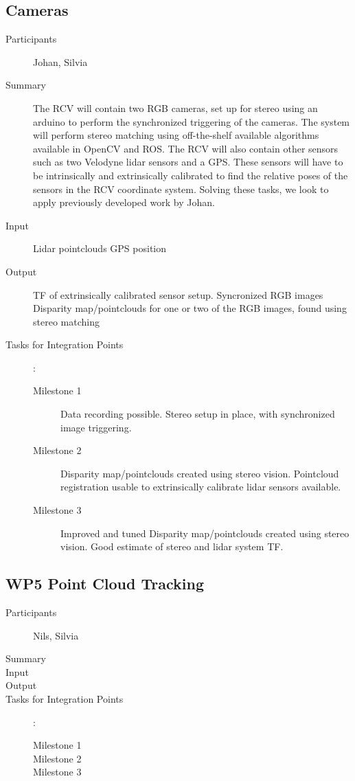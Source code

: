\documentclass[11pt,a4paper]{article}
\begin{document}
\subsection{Cameras} %
\begin{description}
\item[Participants] Johan, Silvia
\item[Summary]

The RCV will contain two RGB cameras, set up for stereo using an arduino to perform the synchronized triggering of the cameras. The system will perform stereo matching using off-the-shelf available algorithms available in OpenCV and ROS. The RCV will also contain other sensors such as two Velodyne lidar sensors and a GPS. These sensors will have to be intrinsically and extrinsically calibrated to find the relative poses of the sensors in the RCV coordinate system. Solving these tasks, we look to apply previously developed work by Johan. 

\item[Input]
	Lidar pointclouds
	GPS position
\item[Output]
	TF of extrinsically calibrated sensor setup.
	Syncronized RGB images
	Disparity map/pointclouds for one or two of the RGB images, found using stereo matching
\item[Tasks for Integration Points]:\
	\begin{description}
		\item[Milestone 1]
			Data recording possible.
			Stereo setup in place, with synchronized image triggering.
		\item[Milestone 2]
			Disparity map/pointclouds created using stereo vision.
			Pointcloud registration usable to extrinsically calibrate lidar sensors available.
		\item[Milestone 3]
			Improved and tuned Disparity map/pointclouds created using stereo vision.
			Good estimate of stereo and lidar system TF.
	\end{description}	 
\end{description}

\subsection{WP5 Point Cloud Tracking}

\begin{description}
\item[Participants] Nils, Silvia
\item[Summary]
\item[Input]
\item[Output]
\item[Tasks for Integration Points]:\
	\begin{description}
		\item[Milestone 1]
		\item[Milestone 2]
		\item[Milestone 3] 
	\end{description}	 
\end{description}
\end{document}
